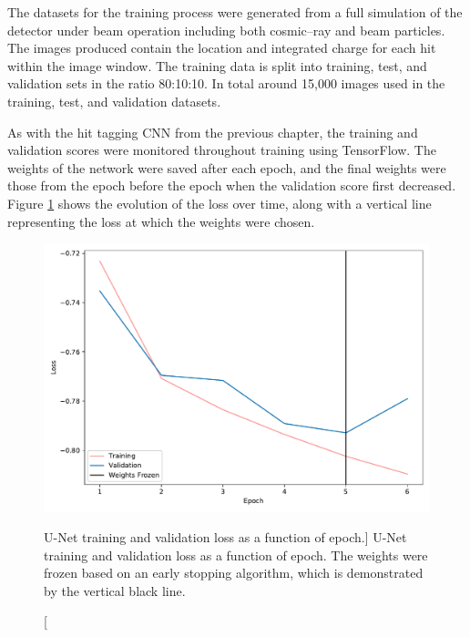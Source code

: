 The datasets for the training process were generated from a full simulation of 
the \protodune{} detector under beam operation including both cosmic--ray and
beam particles. The images produced contain the location and integrated charge
for each hit within the image window. The training data is split into 
training, test, and validation sets in the ratio 80:10:10. In total around 
15,000 images used in the training, test, and validation datasets. 

As with the hit tagging CNN from the previous chapter, the training and
validation scores were monitored throughout training using TensorFlow. The
weights of the network were saved after each epoch, and the final weights were
those from the epoch before the epoch when the validation score first decreased.
Figure \ref{fig:unet_loss} shows the evolution of the loss over time, along with
a vertical line representing the loss at which the weights were chosen.
\begin{figure}
	\centering
	\includegraphics[width=\textwidth]{figures/unet_loss.pdf}
	\caption
	[U-Net training and validation loss as a function of epoch.]
	{U-Net training and validation loss as a function of epoch. The weights were
	frozen based on an early stopping algorithm, which is demonstrated by the
	vertical black line.}
	\label{fig:unet_loss}
\end{figure}

